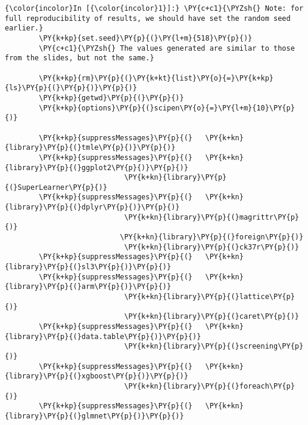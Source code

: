   \begin{Verbatim}[commandchars=\\\{\}]
{\color{incolor}In [{\color{incolor}1}]:} \PY{c+c1}{\PYZsh{} Note: for full reproducibility of results, we should have set the random seed earlier.}
        \PY{k+kp}{set.seed}\PY{p}{(}\PY{l+m}{518}\PY{p}{)}
        \PY{c+c1}{\PYZsh{} The values generated are similar to those from the slides, but not the same.}
        
        \PY{k+kp}{rm}\PY{p}{(}\PY{k+kt}{list}\PY{o}{=}\PY{k+kp}{ls}\PY{p}{(}\PY{p}{)}\PY{p}{)}
        \PY{k+kp}{getwd}\PY{p}{(}\PY{p}{)}
        \PY{k+kp}{options}\PY{p}{(}scipen\PY{o}{=}\PY{l+m}{10}\PY{p}{)}
        
        \PY{k+kp}{suppressMessages}\PY{p}{(}   \PY{k+kn}{library}\PY{p}{(}tmle\PY{p}{)}\PY{p}{)}
        \PY{k+kp}{suppressMessages}\PY{p}{(}   \PY{k+kn}{library}\PY{p}{(}ggplot2\PY{p}{)}\PY{p}{)}
                            \PY{k+kn}{library}\PY{p}{(}SuperLearner\PY{p}{)}
        \PY{k+kp}{suppressMessages}\PY{p}{(}   \PY{k+kn}{library}\PY{p}{(}dplyr\PY{p}{)}\PY{p}{)}
                            \PY{k+kn}{library}\PY{p}{(}magrittr\PY{p}{)}
                           \PY{k+kn}{library}\PY{p}{(}foreign\PY{p}{)}
                            \PY{k+kn}{library}\PY{p}{(}ck37r\PY{p}{)}
        \PY{k+kp}{suppressMessages}\PY{p}{(}   \PY{k+kn}{library}\PY{p}{(}sl3\PY{p}{)}\PY{p}{)}
        \PY{k+kp}{suppressMessages}\PY{p}{(}   \PY{k+kn}{library}\PY{p}{(}arm\PY{p}{)}\PY{p}{)}
                            \PY{k+kn}{library}\PY{p}{(}lattice\PY{p}{)}
                            \PY{k+kn}{library}\PY{p}{(}caret\PY{p}{)}
        \PY{k+kp}{suppressMessages}\PY{p}{(}   \PY{k+kn}{library}\PY{p}{(}data.table\PY{p}{)}\PY{p}{)}
                            \PY{k+kn}{library}\PY{p}{(}screening\PY{p}{)}
        \PY{k+kp}{suppressMessages}\PY{p}{(}   \PY{k+kn}{library}\PY{p}{(}xgboost\PY{p}{)}\PY{p}{)}
                            \PY{k+kn}{library}\PY{p}{(}foreach\PY{p}{)}
        \PY{k+kp}{suppressMessages}\PY{p}{(}   \PY{k+kn}{library}\PY{p}{(}glmnet\PY{p}{)}\PY{p}{)}
\end{Verbatim}

